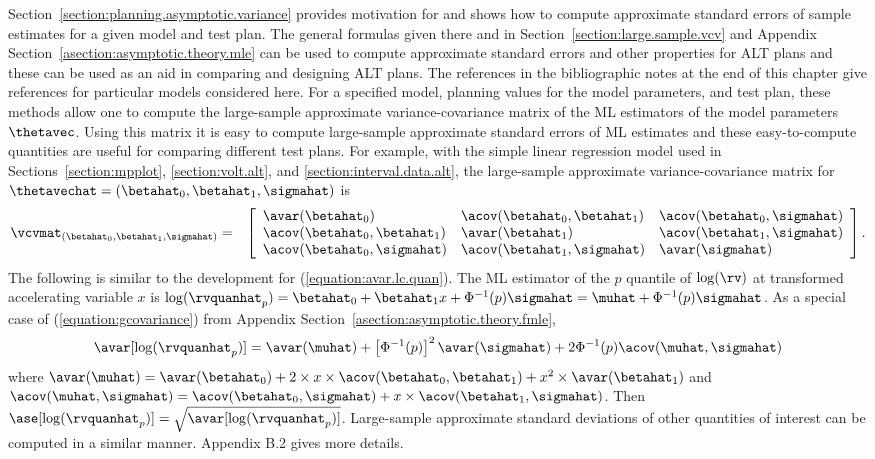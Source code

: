 Section~\ref{section:planning.asymptotic.variance} provides
motivation for and shows how to compute approximate standard errors
of sample estimates for a given model and test plan. The general
formulas given there and in Section~\ref{section:large.sample.vcv}
and Appendix Section~\ref{asection:asymptotic.theory.mle} can be
used to compute approximate standard errors and other properties for
ALT plans and these can be used as an aid in comparing and designing
ALT plans.  The references in the bibliographic notes at the end of
this chapter give references for particular models considered
here. For a specified model, planning values for the model
parameters, and test plan, these methods allow one to compute the
large-sample approximate variance-covariance matrix of the ML
estimators of the model parameters $\thetavec$. Using this matrix it
is easy to compute large-sample approximate standard errors of ML
estimates and these easy-to-compute quantities are useful for
comparing different test plans.  For example, with the simple linear
regression model used in Sections~\ref{section:mpplot},
\ref{section:volt.alt}, and \ref{section:interval.data.alt}, 
the large-sample approximate variance-covariance matrix for
$\thetavechat=(\betahat_{0},\betahat_{1},\sigmahat)$ is
\begin{eqnarray*}
\vcvmat_{(\betahat_{0},\betahat_{1},\sigmahat)} &=& 
\left [
 \begin{array}{lll}
  \avar(\betahat_{0}) &  \acov(\betahat_{0}, 
\betahat_{1})& \acov(\betahat_{0}, \sigmahat) \\
  \acov(\betahat_{0}, \betahat_{1}) &  
\avar( \betahat_{1} )  &\acov(\betahat_{1}, \sigmahat)\\
  \acov(\betahat_{0}, \sigmahat) &\acov(\betahat_{1}, \sigmahat)&  
\avar(\sigmahat)  \\
 \end{array}
\right ].
\end{eqnarray*}
The following is similar to the development for
(\ref{equation:avar.lc.quan}).  The ML estimator of the $p$ quantile
of $\log(\rv)$ at transformed accelerating variable $x$ is
$\log(\rvquanhat_{p}) = \betahat_{0}+ \betahat_{1} x +
\Phi^{-1}(p)\sigmahat=\muhat+\Phi^{-1}(p)\sigmahat$. As a 
special case of (\ref{equation:gcovariance}) from Appendix
Section~\ref{asection:asymptotic.theory.fmle},
\begin{equation}
\label{equation:avar.alt.lc}
\avar[\log(\rvquanhat_{p})]=
	 \avar(\muhat) +\left [\Phi^{-1}(p) \right ]^{2} \avar(\sigmahat)
     +2 \Phi^{-1}(p) \acov(\muhat, \sigmahat)
\end{equation}
where $\avar(\muhat)=\avar(\betahat_{0}) + 2 \times x \times
\acov(\betahat_{0}, \betahat_{1}) + x^{2} \times \avar(\betahat_{1}
) $ and
$\acov(\muhat, \sigmahat)= \acov(\betahat_{0}, \sigmahat) + x
\times \acov(\betahat_{1}, \sigmahat)$. Then
$\ase[\log(\rvquanhat_{p})]=
\sqrt{\avar[\log(\rvquanhat_{p})]}$.
Large-sample approximate standard deviations of other quantities
of interest can be computed in a similar manner. Appendix B.2 gives more
details.

